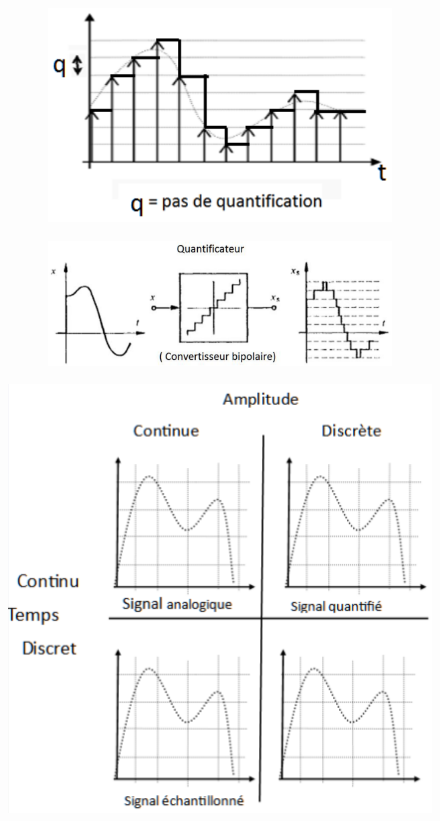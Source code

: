 \documentclass{article}
\begin{document}
\begin{figure}[H]
    \centering
    \begin{subfigure}{.3\textwidth}
        \centering
        \includegraphics[width=\linewidth]{./images/quantification1.png}
    \end{subfigure}
    \begin{subfigure}{.6\textwidth}
        \centering
        \includegraphics[width=\linewidth]{./images/quantification2.png}
    \end{subfigure}
\end{figure}
\begin{figure}[H]
    \centering
    \includegraphics[width=0.6\linewidth]{images/quantification3.png}
\end{figure}
\end{document}
